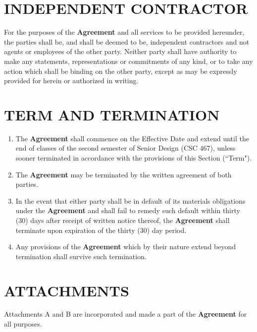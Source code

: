 \documentclass[11pt]{article}
\begin{document}
\section{INDEPENDENT CONTRACTOR}  

For the purposes of the \textbf{Agreement} and all services to be provided hereunder, the parties shall be, and shall be deemed to be, independent contractors and not agents or employees of the other party. Neither party shall have authority to make any statements, representations or commitments of any kind, or to take any action which shall be binding on the other party, except as may be expressly provided for herein or authorized in writing.  

\section{TERM AND TERMINATION }    
\begin{enumerate}  \itemsep4pt \parskip0pt 
\item The \textbf{Agreement} shall commence on the Effective Date and extend until the end of classes of the second semester of Senior Design (CSC 467), unless sooner terminated in accordance with the provisions of this Section (``Term"). 

\item The \textbf{Agreement} may be terminated by the written agreement of both       parties.    

\item In the event that either party shall be in default of its       materials obligations under the \textbf{Agreement} and shall fail to       remedy such default within thirty (30) days after receipt of       written notice thereof, the \textbf{Agreement} shall terminate upon       expiration of the thirty (30) day period.    

\item Any provisions of the \textbf{Agreement} which by their nature extend       beyond termination shall survive such termination.  
\end{enumerate}


\section{ATTACHMENTS}  

Attachments A and B are incorporated and made a part of the \textbf{Agreement} for all purposes.  
\end{document}
